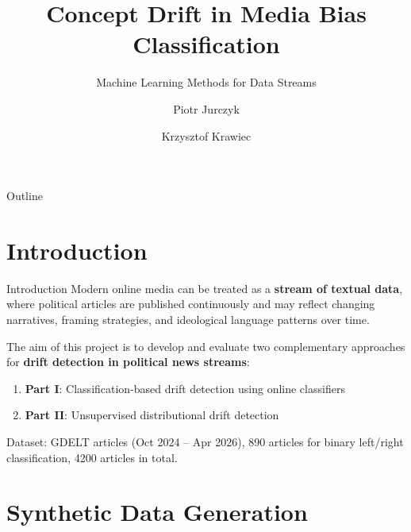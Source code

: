 \documentclass[11pt]{beamer}
\title[]{Concept Drift in Media Bias Classification}
\subtitle{Machine Learning Methods for Data Streams}
\author[P. Jurczyk, K. Krawiec]{Piotr Jurczyk \and Krzysztof Krawiec}
\institute[WUT]
{
   \\
  Warsaw University of Technology
}
\begin{document}
\begin{frame}
  \titlepage
\end{frame}

\begin{frame}{Outline}
  \tableofcontents
\end{frame}


\section{Introduction}

\begin{frame}{Introduction}
Modern online media can be treated as a \textbf{stream of textual data}, where political articles are published continuously and may reflect changing narratives, framing strategies, and ideological language patterns over time.

\vspace{0.3cm}

The aim of this project is to develop and evaluate two complementary approaches for \textbf{drift detection in political news streams}:
\begin{enumerate}
    \item \textbf{Part I}: Classification-based drift detection using online classifiers
    \item \textbf{Part II}: Unsupervised distributional drift detection
\end{enumerate}

\vspace{0.3cm}

Dataset: GDELT articles (Oct 2024 -- Apr 2026), 890 articles for binary left/right classification, 4200 articles in total.

\end{frame}

\section{Synthetic Data Generation}
\end{document}

